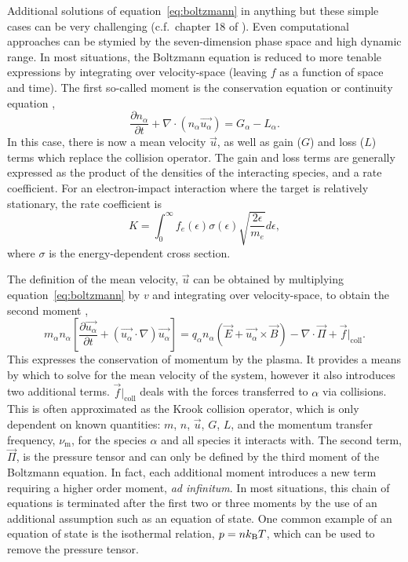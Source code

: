 Additional solutions of equation~\ref{eq:boltzmann} in anything but these simple
cases can be very challenging (c.f.\ chapter 18 of \cite{Lieberman2005}). Even
computational approaches can be stymied by the seven-dimension phase space and
high dynamic range. In most situations, the Boltzmann equation is reduced to
more tenable expressions by integrating over velocity-space (leaving $f$ as a
function of space and time). The first so-called moment is the conservation
equation or continuity equation \cite{Lieberman2005},
\begin{equation}\label{eq:cont}
  \frac{\partial n_\alpha}{\partial t} + \nabla \cdot (n_\alpha \vec{u_\alpha})
  = G_\alpha - L_\alpha.
\end{equation}
In this case, there is now a mean velocity $\vec{u}$, as well as gain ($G$) and
loss ($L$) terms which replace the collision operator. The gain and loss terms
are generally expressed as the product of the densities of the interacting
species, and a rate coefficient. For an electron-impact interaction where the
target is relatively stationary, the rate coefficient is
\begin{equation}
  K = \int_0^\infty f_e(\epsilon)\sigma(\epsilon)
      \sqrt{\frac{2\epsilon}{m_e}}d\epsilon,
\end{equation}
where $\sigma$ is the energy-dependent cross section.

The definition of the mean velocity, $\vec{u}$ can be obtained by multiplying
equation~\ref{eq:boltzmann} by $v$ and integrating over velocity-space, to
obtain the second moment \cite{Lieberman2005},
\begin{equation}
  m_\alpha n_\alpha \left[ \frac{\partial \vec{u_\alpha}}{\partial t}
  + (\vec{u_\alpha} \cdot \nabla) \vec{u_\alpha}\right]
  = q_\alpha n_\alpha (\vec{E} + \vec{u_\alpha} \times \vec{B})
  - \nabla \cdot \vec{\Pi} + \vec{f}|_\mathrm{coll}.
  \label{eq:momentum}
\end{equation}
This expresses the conservation of momentum by the plasma. It provides a means
by which to solve for the mean velocity of the system, however it also
introduces two additional terms. $\vec{f}|_\mathrm{coll}$ deals with the forces
transferred to $\alpha$ via collisions. This is often approximated as the Krook
collision operator, which is only dependent on known quantities: $m$, $n$,
$\vec{u}$, $G$, $L$, and the momentum transfer frequency, $\nu_\mathrm{m}$, for
the species $\alpha$ and all species it interacts with. The second term,
$\vec{\Pi}$, is the pressure tensor and can only be defined by the third moment
of the Boltzmann equation. In fact, each additional moment introduces a new term
requiring a higher order moment, \emph{ad infinitum}. In most situations, this
chain of equations is terminated after the first two or three moments by the use
of an additional assumption such as an equation of state. One common example of
an equation of state is the isothermal relation, $p = nk_\mathrm{B} T$, which can be used
to remove the pressure tensor.

